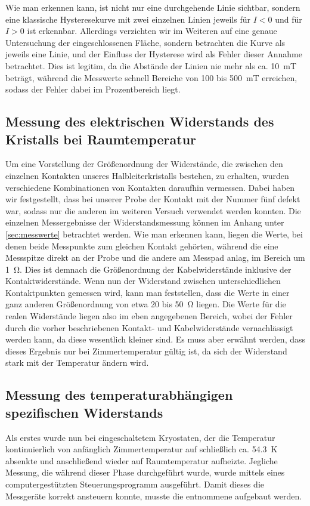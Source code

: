 Wie man erkennen kann, ist nicht nur eine durchgehende Linie sichtbar, sondern
eine klassische Hysteresekurve mit zwei einzelnen Linien jeweils für $I<0$ und
für $I>0$ ist erkennbar. Allerdings verzichten wir im Weiteren auf eine genaue
Untersuchung der eingeschlossenen Fläche, sondern betrachten die Kurve als
jeweils eine Linie, und der Einfluss der Hysterese wird als Fehler dieser
Annahme betrachtet. Dies ist legitim, da die Abstände der Linien nie mehr als
ca. \SI{10}{\milli\tesla} beträgt, während die Messwerte schnell Bereiche von
100 bis \SI{500}{\milli\tesla} erreichen, sodass der Fehler dabei im
Prozentbereich liegt.

\subsection{Messung des elektrischen Widerstands des Kristalls bei
Raumtemperatur}
Um eine Vorstellung der Größenordnung der Widerstände, die zwischen den
einzelnen Kontakten unseres Halbleiterkristalls bestehen, zu erhalten, wurden
verschiedene Kombinationen von Kontakten daraufhin vermessen. Dabei haben wir
festgestellt, dass bei unserer Probe der Kontakt mit der Nummer fünf defekt
war, sodass nur die anderen im weiteren Versuch verwendet werden konnten. Die
einzelnen Messergebnisse der Widerstandsmessung können im Anhang unter
\ref{sec:messwerte} betrachtet werden. Wie man erkennen kann, liegen die
Werte, bei denen beide Messpunkte zum gleichen Kontakt gehörten, während die
eine Messspitze direkt an der Probe und die andere am Messpad anlag, im Bereich
um \SI{1}{\ohm}. Dies ist demnach die Größenordnung der Kabelwiderstände
inklusive der Kontaktwiderstände. Wenn nun der Widerstand zwischen
unterschiedlichen Kontaktpunkten gemessen wird, kann man feststellen, dass die 
Werte in einer ganz anderen Größenordnung von etwa 20 bis \SI{50}{\ohm} liegen.
Die Werte für die realen Widerstände liegen also im eben angegebenen Bereich,
wobei der Fehler durch die vorher beschriebenen Kontakt- und Kabelwiderstände
vernachlässigt werden kann, da diese wesentlich kleiner sind. Es muss aber
erwähnt werden, dass dieses Ergebnis nur bei Zimmertemperatur gültig ist, da
sich der Widerstand stark mit der Temperatur ändern wird.

\subsection{Messung des temperaturabhängigen spezifischen Widerstands}
Als erstes wurde nun bei eingeschaltetem Kryostaten, der die Temperatur
kontinuierlich von anfänglich Zimmertemperatur auf schließlich ca.
\SI{54,3}{\kelvin} absenkte und anschließend wieder auf Raumtemperatur
aufheizte. Jegliche Messung, die während dieser Phase durchgeführt wurde, wurde
mittels eines computergestützten Steuerungsprogramm ausgeführt. Damit dieses
die Messgeräte korrekt ansteuern konnte, musste die \cite{script} entnommene
 aufgebaut werden.

